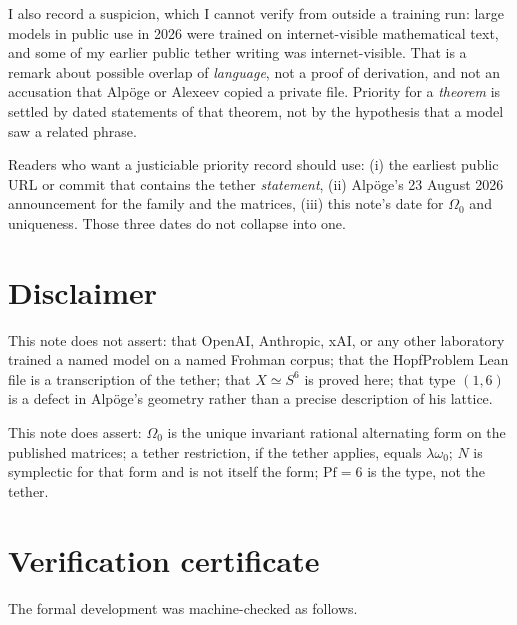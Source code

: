 \documentclass[11pt,a4paper]{article}
\theoremstyle{definition}
\theoremstyle{remark}
\newcommand{\Pf}{\mathrm{Pf}}
\begin{document}
I also record a suspicion, which I cannot verify from outside a training run: large models in public use in 2026 were trained on internet-visible mathematical text, and some of my earlier public tether writing was internet-visible. That is a remark about possible overlap of \emph{language}, not a proof of derivation, and not an accusation that Alp\"oge or Alexeev copied a private file. Priority for a \emph{theorem} is settled by dated statements of that theorem, not by the hypothesis that a model saw a related phrase.

Readers who want a justiciable priority record should use: (i) the earliest public URL or commit that contains the tether \emph{statement}, (ii) Alp\"oge's 23 August 2026 announcement for the family and the matrices, (iii) this note's date for $\Omega_0$ and uniqueness. Those three dates do not collapse into one.

\section*{Disclaimer}

This note does not assert: that OpenAI, Anthropic, xAI, or any other laboratory trained a named model on a named Frohman corpus; that the HopfProblem Lean file is a transcription of the tether; that $X\simeq S^6$ is proved here; that type $(1,6)$ is a defect in Alp\"oge's geometry rather than a precise description of his lattice.

This note does assert: $\Omega_0$ is the unique invariant rational alternating form on the published matrices; a tether restriction, if the tether applies, equals $\lambda\omega_0$; $N$ is symplectic for that form and is not itself the form; $\Pf=6$ is the type, not the tether.

\appendix
\section{Verification certificate}\label{app:verification-certificate}

The formal development was machine-checked as follows.
\end{document}
